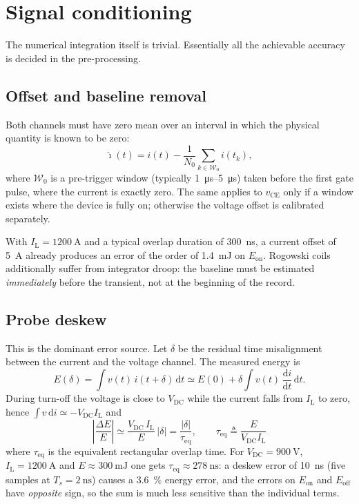 \documentclass[11pt,a4paper]{article}
\newcommand{\Eon}{E_{\mathrm{on}}}
\newcommand{\Eoff}{E_{\mathrm{off}}}
\newcommand{\vce}{v_{\mathrm{CE}}}
\newcommand{\Vdc}{V_{\mathrm{DC}}}
\newcommand{\IL}{I_{\mathrm{L}}}
\begin{document}
\section{Signal conditioning}

The numerical integration itself is trivial. Essentially all the achievable accuracy is
decided in the pre-processing.

\subsection{Offset and baseline removal}

Both channels must have zero mean over an interval in which the physical quantity is
known to be zero:
\begin{equation}
\hat{\imath}(t) = i(t) - \frac{1}{N_0}\sum_{k\in\mathcal{W}_0} i(t_k),
\end{equation}
where $\mathcal{W}_0$ is a pre-trigger window (typically \SIrange{1}{5}{\micro\second})
taken before the first gate pulse, where the current is exactly zero. The same applies to
$\vce$ only if a window exists where the device is fully on; otherwise the voltage offset
is calibrated separately.

With $\IL=\SI{1200}{\ampere}$ and a typical overlap duration of \SI{300}{\nano\second}, a
current offset of \SI{5}{\ampere} already produces an error of the order of
\SI{1.4}{\milli\joule} on $\Eon$. Rogowski coils additionally suffer from integrator
droop: the baseline must be estimated \emph{immediately} before the transient, not at the
beginning of the record.

\subsection{Probe deskew}

This is the dominant error source. Let $\delta$ be the residual time misalignment between
the current and the voltage channel. The measured energy is
\begin{equation}
E(\delta)=\int v(t)\, i(t+\delta)\,\mathrm{d}t
\simeq E(0)+\delta\int v(t)\,\frac{\mathrm{d}i}{\mathrm{d}t}\,\mathrm{d}t .
\end{equation}
During turn-off the voltage is close to $\Vdc$ while the current falls from $\IL$ to
zero, hence $\int v\,\mathrm{d}i \simeq -\Vdc \IL$ and
\begin{equation}
\boxed{\;\left|\frac{\Delta E}{E}\right| \simeq \frac{\Vdc\,\IL}{E}\,|\delta|
= \frac{|\delta|}{\tau_{\mathrm{eq}}},\qquad
\tau_{\mathrm{eq}}\triangleq\frac{E}{\Vdc \IL}\;}
\label{eq:deskew}
\end{equation}
where $\tau_{\mathrm{eq}}$ is the equivalent rectangular overlap time. For
$\Vdc=\SI{900}{\volt}$, $\IL=\SI{1200}{\ampere}$ and $E\approx\SI{300}{\milli\joule}$ one
gets $\tau_{\mathrm{eq}}\approx\SI{278}{\nano\second}$: a deskew error of
\SI{10}{\nano\second} (five samples at $T_s=\SI{2}{\nano\second}$) causes a
\SI{3.6}{\percent} energy error, and the errors on $\Eon$ and $\Eoff$ have
\emph{opposite} sign, so the sum is much less sensitive than the individual terms.
\end{document}
